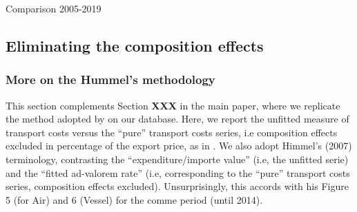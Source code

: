 \documentclass[11pt,twoside, authoryear]{elsarticle}
\begin{document}
\begin{table}[htbp]
	\caption{Comparison 2005-2019}
	\begin{center}		
		
	\end{center}
	\label{tab_comp_referee1_baseline}%
\end{table}%



\subsection{Eliminating the composition effects} \label{sec_oa:comp-effects}

\subsubsection{More on the Hummel's methodology}

This section complements Section \textbf{XXX} in the main paper, where we replicate the method adopted by \cite{hummels2007} on our database. Here, we report the unfitted measure of transport costs versus the ``pure'' transport costs series, i.e composition effects excluded
in percentage of the export price, as in \cite{hummels2007}. We also adopt Himmel's (2007) terminology, contrasting the ``expenditure/importe value'' (i.e, the unfitted serie) and the ``fitted ad-valorem rate'' (i.e, corresponding to the ``pure'' transport costs series, composition effects excluded). Unsurprisingly, this accords with his Figure 5 (for Air) and 6 (Vessel) for the comme period (until 2014).
\end{document}
